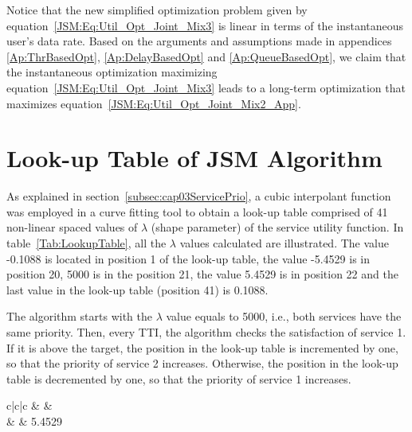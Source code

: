 \begin{apendicesenv}
Notice that the new simplified optimization problem given by equation~\eqref{JSM:Eq:Util_Opt_Joint_Mix3} is linear in terms of the instantaneous user's data rate. Based on the arguments and assumptions made in appendices \ref{Ap:ThrBasedOpt}, \ref{Ap:DelayBasedOpt} and \ref{Ap:QueueBasedOpt}, we claim that the instantaneous optimization maximizing equation~\eqref{JSM:Eq:Util_Opt_Joint_Mix3} leads to a long-term optimization that maximizes equation~\eqref{JSM:Eq:Util_Opt_Joint_Mix2_App}. 


\chapter{Look-up Table of JSM Algorithm}
\label{JSM:Ap:LookupTable}

\thispagestyle{empty}

As explained in section~\ref{subsec:cap03ServicePrio}, a cubic interpolant function was employed in a curve fitting tool to obtain a look-up table comprised of 41 non-linear spaced values of $\lambda$ (shape parameter) of the service utility function. In table~\ref{Tab:LookupTable}, all the $\lambda$ values calculated are illustrated. The value -0.1088 is located in position 1 of the look-up table, the value -5.4529 is in position 20, 5000 is in the position 21, the value 5.4529 is in position 22 and the last value in the look-up table (position 41) is 0.1088.

The algorithm starts with the $\lambda$ value equals to 5000, i.e., both services have the same priority. Then, every \acs{TTI}, the algorithm checks the satisfaction of service 1. If it is above the target, the position in the look-up table is incremented by one, so that the priority of service 2 increases. Otherwise, the position in the look-up table is decremented by one, so that the priority of service 1 increases.   

\begin{table}[!ht]
	\centering
	\begin{threeparttable}[t]
		\begin{tabular}[t]{c|c|c}
			\toprule
			 &  & \\
			 &  & 5.4529\\
			

\end{tabular}
\end{threeparttable}
\end{table}
\end{apendicesenv}
